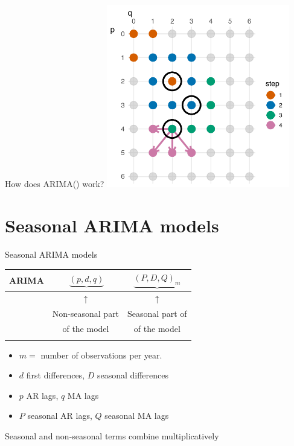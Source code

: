 \documentclass[
  14pt,
  ignorenonframetext,
  aspectratio=169,
]{beamer}
\providecommand{\tightlist}{%
  \setlength{\itemsep}{0pt}\setlength{\parskip}{0pt}}\usepackage{longtable,booktabs,array}
\begin{document}
\begin{frame}{How does ARIMA() work?}
\protect\hypertarget{how-does-arima-work-5}{}
\includegraphics[width=0.6\textwidth,height=\textheight]{04_arima_files/figure-beamer/ARMAgridsearch4-1.pdf}
\end{frame}

\hypertarget{seasonal-arima-models}{%
\section{Seasonal ARIMA models}\label{seasonal-arima-models}}

\begin{frame}{Seasonal ARIMA models}
\protect\hypertarget{seasonal-arima-models-1}{}
\fontsize{13}{15}\sf

\begin{longtable}[]{@{}rcc@{}}
\toprule\noalign{}
ARIMA & \(~\underbrace{(p, d, q)}\) & \(\underbrace{(P, D, Q)_{m}}\) \\
\midrule\noalign{}
\endhead
& \({\uparrow}\) & \({\uparrow}\) \\
& Non-seasonal part & Seasonal part of \\
& of the model & of the model \\
\bottomrule\noalign{}
\end{longtable}

\vspace*{-0.4cm}

\begin{itemize}
\tightlist
\item
  \(m =\) number of observations per year.
\item
  \(d\) first differences, \(D\) seasonal differences
\item
  \(p\) AR lags, \(q\) MA lags
\item
  \(P\) seasonal AR lags, \(Q\) seasonal MA lags
\end{itemize}

\begin{block}{}
\protect\hypertarget{section-1}{}
Seasonal and non-seasonal terms combine multiplicatively
\end{block}
\end{frame}
\end{document}
